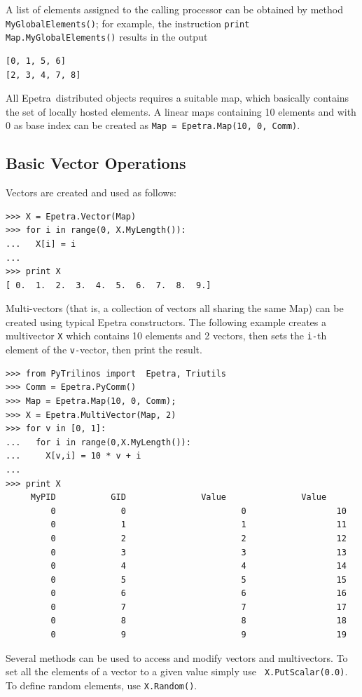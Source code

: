 \documentclass[10pt,relax]{SANDreport}
\newcommand{\epetra}{{Epetra}}
\begin{document}
A list of elements assigned to the calling processor can be obtained by method
\verb!MyGlobalElements()!; for example, the instruction 
{\tt print Map.MyGlobalElements()} results in the output
\begin{verbatim}
[0, 1, 5, 6]
[2, 3, 4, 7, 8]
\end{verbatim}


\medskip

All \epetra\ distributed objects requires a suitable map, which basically
contains the set of locally hosted elements. A linear maps containing 10
elements and with 0 as base index can be created as 
\verb!Map = Epetra.Map(10, 0, Comm)!. 

\subsection{Basic Vector Operations}
\label{sec:vectors}

Vectors are created and used as follows:
\begin{verbatim}
>>> X = Epetra.Vector(Map)
>>> for i in range(0, X.MyLength()):
...   X[i] = i
... 
>>> print X
[ 0.  1.  2.  3.  4.  5.  6.  7.  8.  9.]
\end{verbatim}

Multi-vectors (that is, a collection of vectors all sharing the
same Map) can be created using typical Epetra
constructors. The following example creates a multivector {\tt X} which
contains 10 elements and 2 vectors, then sets the {\tt i-}th element of the
{\tt v-}vector, then print the result.
\begin{verbatim}
>>> from PyTrilinos import  Epetra, Triutils
>>> Comm = Epetra.PyComm()
>>> Map = Epetra.Map(10, 0, Comm);
>>> X = Epetra.MultiVector(Map, 2)
>>> for v in [0, 1]:
...   for i in range(0,X.MyLength()):
...     X[v,i] = 10 * v + i
...
>>> print X
     MyPID           GID               Value               Value  
         0             0                       0                  10
         0             1                       1                  11
         0             2                       2                  12
         0             3                       3                  13
         0             4                       4                  14
         0             5                       5                  15
         0             6                       6                  16
         0             7                       7                  17
         0             8                       8                  18
         0             9                       9                  19
\end{verbatim}
Several methods can be used to access and modify vectors and multivectors.
To set all the elements of a vector to a given value simply use {\tt
  X.PutScalar(0.0)}. To define random elements, use {\tt X.Random()}.
\end{document}
